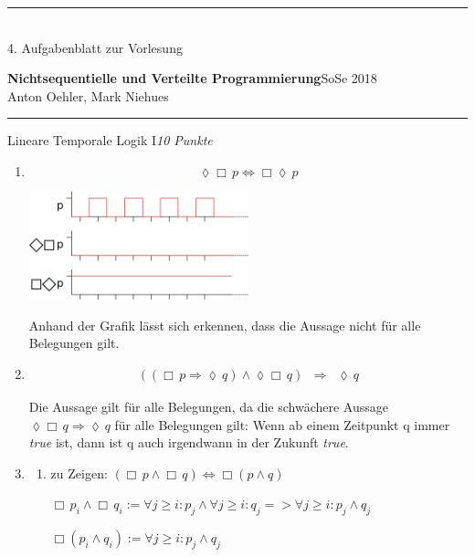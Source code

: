 \documentclass[a4paper,twoside,12pt]{article}
\newcommand{\ZETTELNUMMER}{4}
\newcounter{AUFGNR}
\newcommand{\AUFGABE}[2]{\vspace{0.3cm}\item[Aufgabe~\arabic{AUFGNR}]\stepcounter{AUFGNR} #1\hfill\emph{#2}}
\begin{document}
\pagestyle{empty}
\hrule\medskip
\rule{0ex}{0ex}\\[-1ex]
\ZETTELNUMMER. Aufgabenblatt zur Vorlesung

\smallskip
\noindent
\large
\textbf{Nichtsequentielle und Verteilte Programmierung}\hfill SoSe
2018 \\[0.5ex]
\normalsize
Anton Oehler, Mark Niehues

\newcommand{\immer}{\Box}
\newcommand{\irgendwann}{\lozenge}
\newcommand{\folgt}{\Rightarrow}
\newcommand{\oder}{\vee}
\newcommand{\und}{\wedge}

\medskip\hrule

\begin{description}
\AUFGABE{Lineare Temporale Logik I}{10 Punkte}
\begin{enumerate}
  \item { \[
     \lozenge \Box\, p \Leftrightarrow \Box \lozenge\, p
  \]}
  
  \includegraphics[width=0.5\textwidth]{1_a.png}
  
Anhand der Grafik lässt sich erkennen, dass die Aussage nicht für alle Belegungen gilt.

  \item \begin{eqnarray}
		     ((\Box\, p \Rightarrow \lozenge\, q) \land \lozenge \Box\, q )& \Rightarrow & \lozenge\, q
		\end{eqnarray}

Die Aussage gilt für alle Belegungen, da die schwächere Aussage $\lozenge \Box\, q \Rightarrow \lozenge\, q$ für alle Belegungen gilt: Wenn ab einem Zeitpunkt q immer \textit{true} ist, dann ist q auch irgendwann in der Zukunft \textit{true}.

\item 
\begin{enumerate}
\item zu Zeigen: $(\Box\, p \wedge \Box\, q) \Leftrightarrow \Box (p \wedge q)$

$
\Box\, p_i \wedge \Box\, q_i := \forall j \geq i : p_j \wedge \forall j \geq i:q_j => \forall j \geq i: p_j \wedge q_j
$

$
\Box (p_i \wedge q_i) := \forall j \geq i: p_j \wedge q_j
$ 


\end{enumerate}
\end{enumerate}
\end{description}
\end{document}
